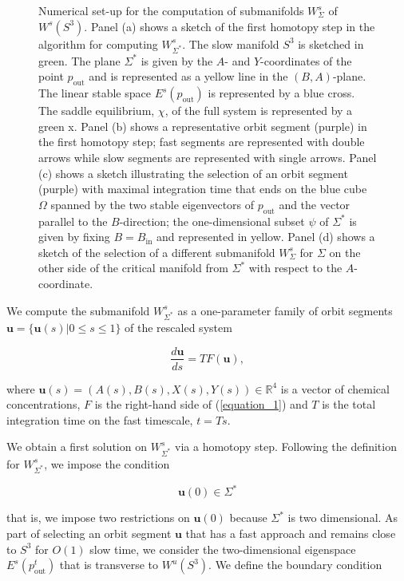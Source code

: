 \documentclass{ws-ijbc}
\begin{document}
\begin{figure}[h]
\caption{Numerical set-up for the computation of submanifolds $W^s_{\Sigma}$ of $W^s(S^3)$.  Panel (a) shows a sketch of the first homotopy step in the algorithm for computing $W^{s}_{\Sigma^*}$.  The slow manifold $S^3$ is sketched in green.  The plane $\Sigma^*$ is given by the $A$- and $Y$-coordinates of the point $p_{\text{out}}$ and is represented as a yellow line in the $(B, A)$-plane.  The linear stable space $E^s(p_{\mathrm{out}})$ is represented by a blue cross. The saddle equilibrium, $\chi$, of the full system is represented by a green x.  Panel (b) shows a representative orbit segment (purple) in the first homotopy step; fast segments are represented with double arrows while slow segments are represented with single arrows.  Panel (c) shows a sketch illustrating the selection of an orbit segment (purple) with maximal integration time that ends on the blue cube $\Omega$ spanned by the two stable eigenvectors of $p_{\text{out}}$ and the vector parallel to the $B$-direction; the one-dimensional subset $\psi$ of $\Sigma^*$ is given by fixing $B = B_{\text{in}}$ and represented in yellow.  Panel (d) shows a sketch of the selection of a different submanifold $W^{s}_{\Sigma}$ for $\Sigma$ on the other side of the critical manifold from $\Sigma^*$ with respect to the $A$-coordinate.}
\end{figure}


We compute the submanifold $W^s_{\Sigma^*}$ as a one-parameter family of orbit segments $\mathbf{u} = \{\mathbf{u}(s)| 0 \leq s \leq 1 \}$ of the rescaled system

\begin{equation}
\frac{d\mathbf{u}}{ds} = TF(\mathbf{u}),
\label{equation_4}
\end{equation}
    
\noindent
where $\mathbf{u}(s) = (A(s), B(s), X(s), Y(s)) \in \mathbb{R}^4$ is a vector of chemical concentrations, $F$ is the right-hand side of (\ref{equation_1}) and $T$ is the total integration time on the fast timescale, $t=Ts$.
    
We obtain a first solution on $W^s_{\Sigma^*}$ via a homotopy step.  Following the definition for $W^s_{\Sigma^*}$, we impose the condition
    
\begin{equation}
\mathbf{u}(0) \in \Sigma^*
\label{BC6}
\end{equation}
    
 \noindent
that is, we impose two restrictions on $\mathbf{u}(0)$ because $\Sigma^*$ is two dimensional.  As part of selecting an orbit segment $\mathbf{u}$ that has a fast approach and remains close to $S^3$ for $O(1)$ slow time, we consider the two-dimensional eigenspace $E^s(p^t_{\text{out}})$ that is transverse to $W^u(S^3)$.  We define the boundary condition
    
\end{document}
